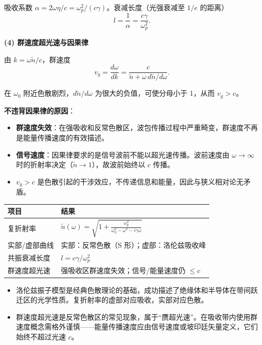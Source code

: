 \begin{derivationbox}[标准解题过程]
吸收系数 $\alpha=2\omega\eta/c=\omega_p^2/(c\gamma)$。衰减长度（光强衰减至 $1/e$ 的距离）
\begin{equation}
\boxed{l=\frac{1}{\alpha}=\frac{c\gamma}{\omega_p^2}.}
\end{equation}

\textbf{(4) 群速度超光速与因果律}

由 $k=\omega\tilde{n}/c$，群速度
\begin{equation}
v_g=\frac{d\omega}{dk}=\frac{c}{\tilde{n}+\omega\,d\tilde{n}/d\omega}.
\end{equation}

在 $\omega_0$ 附近色散剧烈，$d\tilde{n}/d\omega$ 为很大的负值，可使分母小于 1，从而 $v_g>c$。

\textbf{不违背因果律的原因}：
\begin{itemize}
    \item \textbf{群速度失效}：在强吸收和反常色散区，波包传播过程中严重畸变，群速度不再是能量传播速度的有效描述。
    \item \textbf{信号速度}：因果律要求的是信号波前不能以超光速传播。波前速度由 $\omega\to\infty$ 时的折射率决定（$\tilde{n}\to1$），故波前始终以 $c$ 传播。
    \item $v_g>c$ 是色散引起的干涉效应，不传递信息和能量，因此与狭义相对论无矛盾。
\end{itemize}
\end{derivationbox}

\begin{formulabox}[答案汇总]
\begin{center}
\begin{tabular}{ll}
\toprule
\textbf{项目} & \textbf{结果} \\
\midrule
复折射率 & $\displaystyle\tilde{n}(\omega)=\sqrt{1+\frac{\omega_p^2}{\omega_0^2-\omega^2-i\gamma\omega}}$ \\
实部/虚部曲线 & 实部：反常色散（S 形）；虚部：洛伦兹吸收峰 \\
共振衰减长度 & $l=c\gamma/\omega_p^2$ \\
群速度超光速 & 强吸收区群速度失效；信号/能量速度仍 $\le c$ \\
\bottomrule
\end{tabular}
\end{center}
\end{formulabox}

\begin{insightbox}[物理图像]
\begin{itemize}
    \item 洛伦兹振子模型是经典色散理论的基础，成功描述了绝缘体和半导体在带间跃迁区的光学性质。复折射率的虚部对应吸收，实部对应色散。
    \item 群速度超光速是反常色散区的常见现象，属于``赝超光速''。在吸收带内使用群速度概念需格外谨慎——能量传播速度应由信号速度或坡印廷矢量定义，它们始终不超过光速 $c$。
\end{itemize}
\end{insightbox}
